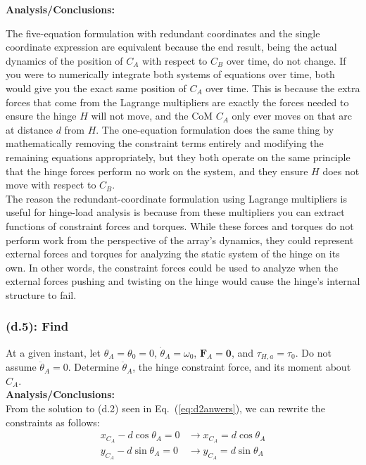 \documentclass[titlepage]{article}
\begin{document}
\textbf{Analysis/Conclusions:}\\
\begin{mdframed}[linewidth=1pt, innertopmargin=10pt, innerbottommargin=10pt]
	The five-equation formulation with redundant coordinates and the single coordinate expression are equivalent because the end result, being the actual dynamics of the position of $C_A$ with respect to $C_B$ over time, do not change. If you were to numerically integrate both systems of equations over time, both would give you the exact same position of $C_A$ over time. This is because the extra forces that come from the Lagrange multipliers are exactly the forces needed to ensure the hinge $H$ will not move, and the CoM $C_A$ only ever moves on that arc at distance $d$ from $H$. The one-equation formulation does the same thing by mathematically removing the constraint terms entirely and modifying the remaining equations appropriately, but they both operate on the same principle that the hinge forces perform no work on the system, and they ensure $H$ does not move with respect to $C_B$.\\
	
	The reason the redundant-coordinate formulation using Lagrange multipliers is useful for hinge-load analysis is because from these multipliers you can extract functions of constraint forces and torques. While these forces and torques do not perform work from the perspective of the array's dynamics, they could represent external forces and torques for analyzing the static system of the hinge on its own. In other words, the constraint forces could be used to analyze when the external forces pushing and twisting on the hinge would cause the hinge's internal structure to fail.
\end{mdframed}

\newpage

\subsubsection*{(d.5): Find}
At a given instant, let $\theta_A=\theta_0=0$, $\dot{\theta}_A=\omega_0$, $\boldsymbol{F}_A=\boldsymbol{0}$, and $\tau_{H,a}=\tau_0$. Do not assume $\ddot{\theta}_A=0$. Determine $\ddot{\theta}_A$, the hinge constraint force, and its moment about $C_A$.\\

\textbf{Analysis/Conclusions:}\\
From the solution to (d.2) seen in Eq.~(\ref{eq:d2anwers}), we can rewrite the constraints as follows:
\begin{equation}
	\begin{split}
		x_{C_A}-d\cos\theta_A=0 &\to x_{C_A}=d\cos\theta_A \\
		y_{C_A}-d\sin\theta_A=0 &\to y_{C_A}=d\sin\theta_A \\
	\end{split}
	\label{eq:constraintrewrite}
\end{equation}
\end{document}
